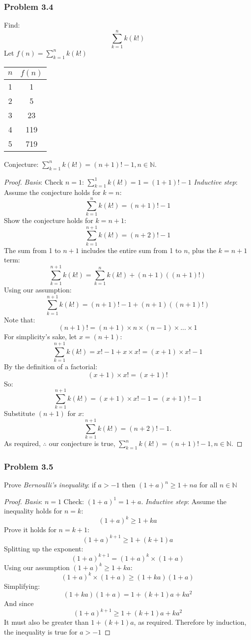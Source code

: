 \documentclass[hidelinks,12pt]{article}
\newcommand{\N}{\mathbb{N}}
\begin{document}
\subsubsection{Problem 3.4}
Find:$$\sum_{k=1}^{n}k(k!)$$
Let $f(n)=\sum_{k=1}^{n}k(k!)$
\begin{center}
    \begin{tabular}{c|c}
    $n$ & $f(n)$\\
    \hline
    1 & 1\\
    \hline
    2 & 5\\
    \hline
    3 & 23\\
    \hline
    4 & 119\\
    \hline
    5 & 719
    \end{tabular}
\end{center}
Conjecture: $\sum_{k=1}^{n}k(k!)=(n+1)!-1, n \in \N$.
\newline\newline\begin{proof}\emph{Basis}: Check $n=1$: $\sum_{k=1}^{1}k(k!)=1=(1+1)!-1$
\newline \emph{Inductive step}: Assume the conjecture holds for $k=n$: $$\sum_{k=1}^{n}k(k!)=(n+1)!-1$$
Show the conjecture holds for $k=n+1$: $$\sum_{k=1}^{n+1}k(k!)=(n+2)!-1$$
The sum from 1 to $n+1$ includes the entire sum from 1 to $n$, plus the $k=n+1$ term:$$\sum_{k=1}^{n+1}k(k!)=\sum_{k=1}^{n}k(k!)+(n+1)((n+1)!)$$
Using our assumption:$$\sum_{k=1}^{n+1}k(k!)=(n+1)!-1+(n+1)((n+1)!)$$
Note that:$$(n+1)!=(n+1)\times n \times(n-1)\times...\times1$$
For simplicity's sake, let $x=(n+1)$:
$$\sum_{k=1}^{n+1}k(k!)=x!-1+x\times x!=(x+1)\times x!-1$$
By the definition of a factorial:$$(x+1)\times x! = (x+1)!$$ So:$$\sum_{k=1}^{n+1}k(k!)=(x+1)\times x!-1=(x+1)!-1$$Substitute $(n+1)$ for $x$:$$\sum_{k=1}^{n+1}k(k!)=(n+2)!-1.$$
As required, $\therefore$ our conjecture is true, $\sum_{k=1}^{n}k(k!)=(n+1)!-1, n \in \N$. \end{proof}
\newpage 
\subsubsection{Problem 3.5}
Prove \emph{Bernoulli's inequality}: if $a>-1$ then $(1+a)^n \geq 1+na$ for all $n \in \N$
\newline\begin{proof} \emph{Basis}: $n=1$ Check: $(1+a)^1=1+a$.
\newline\emph{Inductive step}: Assume the inequality holds for $n=k$: $$(1+a)^k \geq 1+ka$$
Prove it holds for $n=k+1$: $$(1+a)^{k+1}\geq 1+(k+1)a$$Splitting up the exponent:$$(1+a)^{k+1}=(1+a)^k\times(1+a)$$Using our assumption $(1+a)^k \geq 1+ka$:$$(1+a)^k\times(1+a)\geq (1+ka)(1+a)$$Simplifying:$$(1+ka)(1+a)=1+(k+1)a+ka^2$$And since $$(1+a)^{k+1}\geq 1+(k+1)a+ka^2$$It must also be greater than $1+(k+1)a$, as required. Therefore by induction, the inequality is true for $a>-1$ \end{proof}
\end{document}
